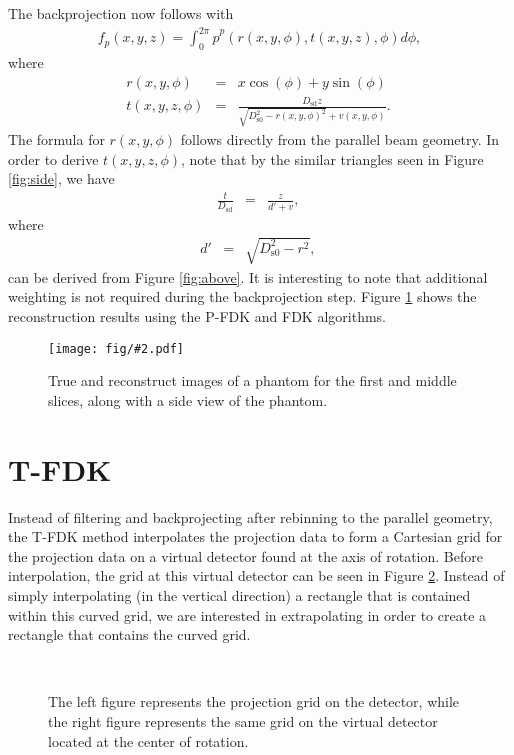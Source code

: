 \documentclass[12pt]{article}
\newcommand{\infig}[2][] {\texttt{[image: fig/\#2.pdf]}}
\begin{document}
The backprojection now follows with
\begin{eqnarray*}
f_p(x,y,z) = \int_0^{2\pi} \hat{p}^p(r(x,y,\phi),t(x,y,z),\phi) d\phi,
\end{eqnarray*}
where
\begin{eqnarray*}
r(x,y,\phi) &=& x \cos(\phi) + y \sin(\phi) \\
t(x,y,z,\phi) &=& \frac{D_\mathrm{sd}z}{\sqrt{D_\mathrm{s0}^2-r(x,y,\phi)^2}+v(x,y,\phi)}. \
\end{eqnarray*}
The formula for $r(x,y,\phi)$ follows directly from the parallel beam geometry. In order to derive 
$t(x,y,z,\phi)$, note that by the similar triangles seen in Figure \ref{fig:side}, we have 
\begin{eqnarray*}
\frac{t}{D_\mathrm{sd}} &=& \frac{z}{d'+v}, \
\end{eqnarray*}
where
\begin{eqnarray*}
d'&=& \sqrt{D_\mathrm{s0}^2-r^2}, \
\end{eqnarray*}
can be derived from Figure \ref{fig:above}.
It is interesting to note that additional weighting is not required
during the backprojection step.
Figure \ref{fig:comp} shows the reconstruction results using
the P-FDK and FDK algorithms. 

\begin{figure}
\centering
\infig[scale=0.6]{comparison}
\caption{True and reconstruct images of a phantom for the first and middle slices, along with a side
view of the phantom.}
\label{fig:comp}
\end{figure}

\section{T-FDK}
Instead of filtering and backprojecting after rebinning to the parallel
geometry, the T-FDK method interpolates the projection data to form a
Cartesian grid for the projection data on a virtual detector found at the axis
of rotation.  Before interpolation, the grid at this virtual detector can be
seen in Figure \ref{grid}. Instead of simply interpolating (in the vertical
direction) a rectangle that is contained within this curved grid, we are
interested in extrapolating in order to create a rectangle that contains the
curved grid.


\begin{figure}[tbh]
\centering
\mbox{
\subfigure{\infig[width=2in]{rectGrid}
\quad
\subfigure{\infig[width=2in]{curved}}
}}
\caption{The left figure represents the projection grid on the detector, while the right figure represents the
same grid on the virtual detector located at the center of rotation.}
\label{grid}
\end{figure}
\end{document}
